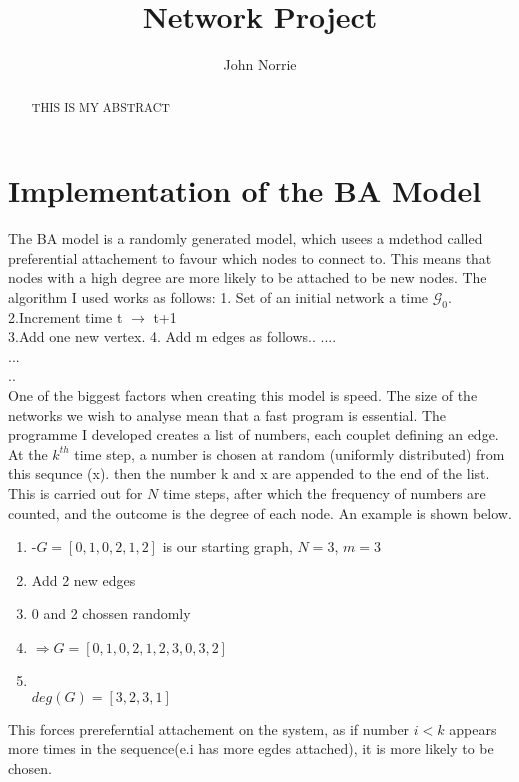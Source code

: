 \documentclass[]{article}
\title{Network Project}
\author{John Norrie}
\begin{document}
\maketitle

\begin{abstract}
THIS IS MY ABSTRACT 
\end{abstract}

\section{Implementation of the BA Model}
The BA model is a randomly generated model, which usees a mdethod called preferential attachement to favour which nodes to connect to. This means that nodes with a high degree are more likely to be attached to be new nodes. The algorithm I used works as follows:
1. Set of an initial network a time $\mathcal{G_0}$.\\
\newline
2.Increment time t $\rightarrow$ t+1\\
\newline
3.Add one new vertex.
4. Add m edges as follows..
....\\...\\..\\
One of the biggest factors when creating this model is speed. The size of the networks we wish to analyse mean that a fast program is essential. The programme I developed creates a list of numbers, each couplet defining an edge. At the $k^{th}$ time step, a number is chosen at random (uniformly distributed) from this sequnce (x). then the number k and x are appended to the end of the list. This is carried out for $N$ time steps, after which the frequency of numbers are counted, and the outcome is the degree of each node. An example is shown below. \\
\begin{enumerate}
\item -$G=[0,1,0,2,1,2]$ is our starting graph, $N=3$, $m=3$
\item Add 2 new edges
\item 0 and 2 chossen randomly
\item $\Rightarrow G=[0,1,0,2,1,2,3,0,3,2]$
\item {}\\ $deg(G)=[3,2,3,1]$
\end{enumerate}
This forces prereferntial attachement on the system, as if number $i<k$ appears more times in the sequence(e.i has more egdes attached), it is more likely to be chosen.
\end{document}
